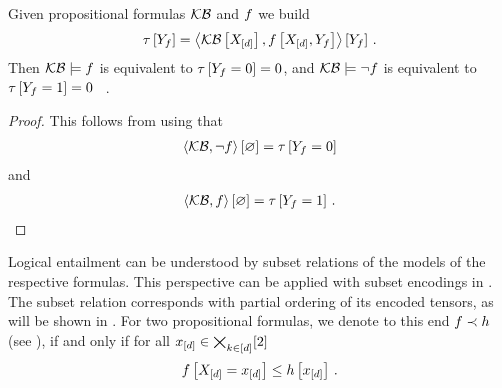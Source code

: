 \begin{theorem}
    \label{the:entailmentContradictionContraction}
    Given propositional formulas $\mathcal{KB}$ and $f$ we build
    \begin{align*}
        \tau\left[Y_{f}\right]
        = \left\langle \mathcal{KB}\left[X_{[d]}\right],f\left[X_{[d]},Y_{f}\right]\right\rangle \left[ Y_{f} \right] \, .
    \end{align*}
    Then $\mathcal{KB}\models f$ is equivalent to $\tau\left[Y_{f}=0\right]=0$, and $\mathcal{KB}\models\lnot f$ is equivalent to $\tau\left[Y_{f}=1\right]=0$ \, .
\end{theorem}
\begin{proof}
    This follows from  using that
    \begin{align*}
        \left\langle \mathcal{KB},\lnot f\right\rangle \left[ \varnothing \right] = \tau\left[Y_{f}=0\right]
    \end{align*}
    and
    \begin{align*}
        \left\langle \mathcal{KB},f\right\rangle \left[ \varnothing \right] = \tau\left[Y_{f}=1\right] \, .
    \end{align*}
\end{proof}






Logical entailment can be understood by subset relations of the models of the respective formulas.
This perspective can be applied with subset encodings in .
The subset relation corresponds with partial ordering of its encoded tensors, as will be shown in .
For two propositional formulas, we denote to this end $f\prec h$ (see ), if and only if for all $x_{[d]}\in\bigtimes_{k\in[d]}[2]$
\begin{align*}
    f\left[X_{[d]}=x_{[d]}\right] \leq h\left[x_{[d]}\right]  \, .
\end{align*}

